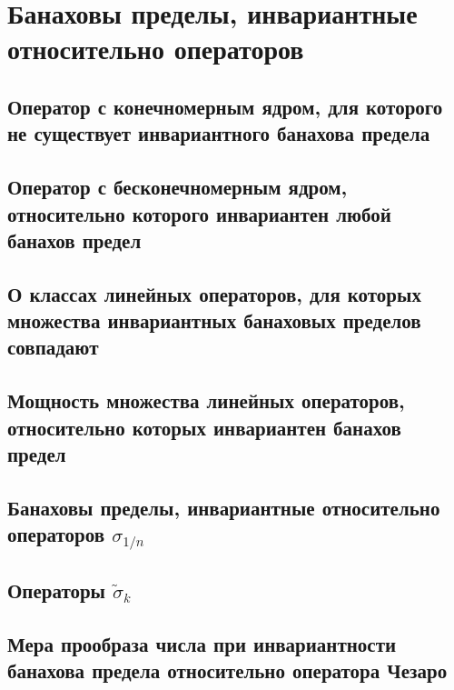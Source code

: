 \documentclass[12pt,a4paper,openbib]{report}
\theoremstyle{definition}
\begin{document}
\chapter{Банаховы пределы, инвариантные относительно операторов}

	

	\section{Оператор с конечномерным ядром, для которого не существует инвариантного банахова предела}
	

	\section{Оператор с бесконечномерным ядром, относительно которого инвариантен любой банахов предел}
	

	\section{О классах линейных операторов, для которых множества инвариантных банаховых пределов совпадают}
	

	\section{Мощность множества линейных операторов, относительно которых инвариантен банахов предел}
	

	\section{Банаховы пределы, инвариантные относительно операторов $\sigma_{1/n}$}
	

	\section{Операторы $\tilde\sigma_k$}
	

	\section{Мера прообраза числа при инвариантности банахова предела относительно оператора Чезаро}
	
\end{document}
